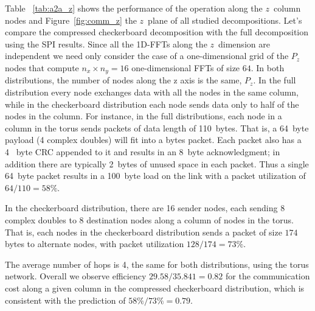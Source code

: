 Table ~\ref{tab:a2a_z} shows the performance of the \alltoall operation
along the $z$~column nodes and Figure~\ref{fig:comm_z} the $z$~plane of all
studied decompositions. Let's compare the compressed checkerboard
decomposition with the full decomposition using the SPI results.
Since all the 1D-FFTs along the $z$~dimension are independent we need
only consider the case of a one-dimensional grid of the $P_z$ nodes
that compute $n_x \times n_y = 16$ one-dimensional FFTs of size $64$.
In both distributions, the number of nodes along the z axis is the
same, $P_z$. In the full distribution every node exchanges data with
all the nodes in the same column, while in the checkerboard
distribution each node sends data only to half of the nodes in the
column. For instance, in the full distributions, each node in a column
in the torus sends packets of data length of 110~bytes. That is, 
a 64~byte payload (4 complex doubles) will fit into a bytes packet. Each packet also
has a 4~ byte CRC appended to it and results in an 8~byte acknowledgment; in addition
there are typically 2~bytes of unused space in each packet. Thus a
single 64~byte packet results in a 100~byte load on the link with a
packet utilization of $64/110 = 58\%$.



In the checkerboard  distribution, there are 16 sender nodes, each sending 8 complex doubles 
to 8 destination nodes along a column of nodes in the torus.
That is, each nodes in the checkerboard distribution sends a packet of size $174~$bytes to 
alternate nodes, with packet utilization $128/174 = 73\% $.
 

The average number of hops is 4, the same for both distributions, 
using the torus network.  Overall we observe efficiency
$29.58/35.841=0.82$ for the communication cost along a given column in
the compressed checkerboard distribution, which is consistent with the
prediction of $58\%/73\% = 0.79$.
 
